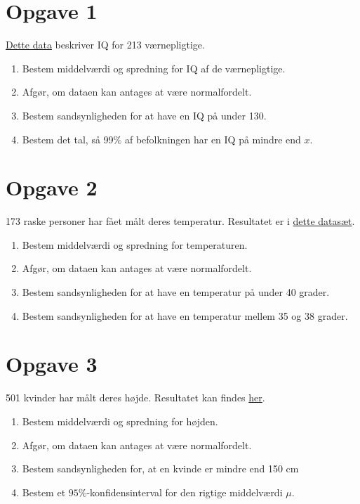 \section*{Opgave 1}
\href{https://github.com/ChristianJLex/TeachingNotes/raw/master/2022-2023/Data%20og%20lign/IQdata.xlsx}{\color{blue!60}Dette data} beskriver IQ for 213 værnepligtige. 
\begin{enumerate}[label=\roman*)]
	\item Bestem middelværdi og spredning for IQ af de værnepligtige.
	\item Afgør, om dataen kan antages at være normalfordelt. 
	\item Bestem sandsynligheden for at have en IQ på under 130.
	\item Bestem det tal, så 99$\%$ af befolkningen har en IQ på mindre end $x$. 
\end{enumerate}

\section*{Opgave 2}
173 raske personer har fået målt deres temperatur. Resultatet er i \href{https://github.com/ChristianJLex/TeachingNotes/raw/master/2022-2023/Data%20og%20lign/Temperaturdata.xlsx}{\color{blue!60} dette datasæt}.
\begin{enumerate}[label=\roman*)]
	\item Bestem middelværdi og spredning for temperaturen.
	\item Afgør, om dataen kan antages at være normalfordelt. 
	\item Bestem sandsynligheden for at have en temperatur på under 40 grader. 
	\item Bestem sandsynligheden for at have en temperatur mellem 35 og 38 grader.  
\end{enumerate}


\section*{Opgave 3}
501 kvinder har målt deres højde. Resultatet kan findes \href{https://github.com/ChristianJLex/TeachingNotes/raw/master/2022-2023/Data%20og%20lign/Hojdedata.xlsx}{\color{blue!60}her}.
\begin{enumerate}
	\item Bestem middelværdi og spredning for højden.
	\item Afgør, om dataen kan antages at være normalfordelt.
	\item Bestem sandsynligheden for, at en kvinde er mindre end 150 cm
	\item Bestem et $95\%$-konfidensinterval for den rigtige middelværdi $\mu$. 
\end{enumerate}
